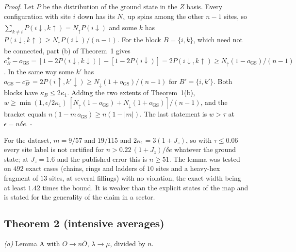 \documentclass[aps,prx,onecolumn,10pt,nofootinbib,longbibliography,floatfix]{revtex4-2}
\theoremstyle{remark}
\newcommand{\Jz}{J_z}
\newcommand{\de}{\delta e}
\newcommand{\GS}{\mathrm{GS}}
\begin{document}
\emph{Proof.} Let $P$ be the distribution of the ground state in the $Z$ basis. Every configuration with site $i$
down has its $N_\uparrow$ up spins among the other $n-1$ sites, so
$\sum_{k\ne i}P(i\downarrow,k\uparrow)=N_\uparrow P(i\downarrow)$ and some $k$ has
$P(i\downarrow,k\uparrow)\ge N_\uparrow P(i\downarrow)/(n-1)$. For the block
$B=\{i,k\}$, which need not be connected, part (b) of Theorem~1 gives %
$c_B^+-o_\GS=[1-2P(i\downarrow,k\downarrow)]-[1-2P(i\downarrow)]=2P(i\downarrow,k\uparrow)\ge N_\uparrow(1-o_\GS)/(n-1)$. %
In the same way some $k'$ has $o_\GS-c_{B'}^-=2P(i\uparrow,k'\downarrow)\ge N_\downarrow(1+o_\GS)/(n-1)$ for %
$B'=\{i,k'\}$. Both blocks have $\kappa_B\le2\kappa_1$. Adding the two extents of Theorem~1(b), %
$w\ge\min(1,\epsilon/2\kappa_1)\,[N_\uparrow(1-o_\GS)+N_\downarrow(1+o_\GS)]/(n-1)$, and the bracket equals %
$n(1-m\,o_\GS)\ge n(1-|m|)$. The last statement is $w>\tau$ at $\epsilon=n\de$. \hfill$\square$

For the dataset, $m=9/57$ and $19/115$ and $2\kappa_1=3(1+\Jz)$, so with $\tau\le0.06$ every site label is %
not certified for $n>0.22\,(1+\Jz)/\de$ whatever the ground state; at $\Jz=1.6$ and the published error this is %
$n\ge51$. The lemma was tested on $492$ exact cases (chains, rings and ladders of $10$ sites and a heavy-hex %
fragment of $13$ sites, at several fillings) with no violation, the exact width being at least $1.42$ times the bound. %
It is weaker than the explicit states of the map and is stated for the generality of the claim in a sector.

\subsection{Theorem 2 (intensive averages)} %
\emph{(a)} Lemma A with $O\to n\bar O$, $\lambda\to\mu$, divided by $n$.
\end{document}
